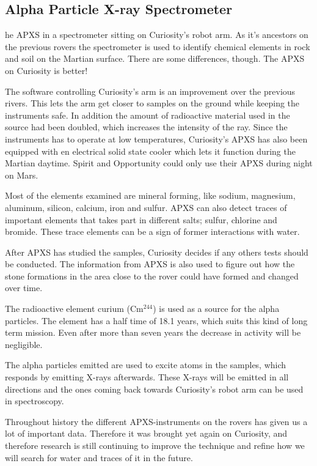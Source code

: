 \subsection*{Alpha Particle X-ray Spectrometer}
he APXS in a spectrometer sitting on Curiosity's robot arm.
As it's ancestors on the previous rovers the spectrometer is used to identify chemical elements in rock and soil on the Martian surface.
There are some differences, though.
The APXS on Curiosity is better!

The software controlling Curiosity's arm is an improvement over the previous rivers.
This lets the arm get closer to samples on the ground while keeping the instruments safe.
In addition the amount of radioactive material used in the source had been doubled, which increases the intensity of the ray.
Since the instruments has to operate at low temperatures, Curiosity's APXS has also been equipped with en electrical solid state cooler which lets it function during the Martian daytime.
Spirit and Opportunity could only use their APXS during night on Mars.

Most of the elements examined are mineral forming, like sodium, magnesium, aluminum, silicon, calcium, iron and sulfur.
APXS can also detect traces of important elements that takes part in different salts; sulfur, chlorine and bromide.
These trace elements can be a sign of former interactions with water.

After APXS has studied the samples, Curiosity decides if any others tests should be conducted.
The information from APXS is also used to figure out how the stone formations in the area close to the rover could have formed and changed over time.

The radioactive element curium (Cm$^{244}$) is used as a source for the alpha particles.
The element has a half time of 18.1 years, which suits this kind of long term mission.
Even after more than seven years the decrease in activity will be negligible.

The alpha particles emitted are used to excite atoms in the samples, which responds by emitting X-rays afterwards.
These X-rays will be emitted in all directions and the ones coming back towards Curiosity's robot arm can be used in spectroscopy.

Throughout history the different APXS-instruments on the rovers has given us a lot of important data.
Therefore it was brought yet again on Curiosity, and therefore research is still continuing to improve the technique and refine how we will search for water and traces of it in the future.